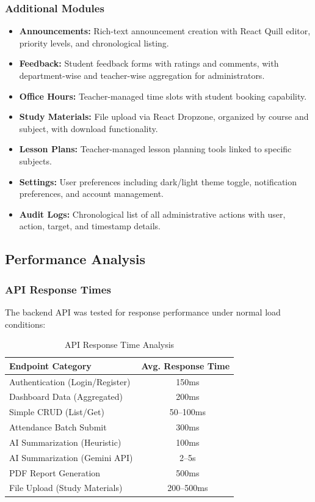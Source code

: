 \subsubsection{Additional Modules}

\begin{itemize}[leftmargin=2em]
    \item \textbf{Announcements:} Rich-text announcement creation with React Quill editor, priority levels, and chronological listing.
    \item \textbf{Feedback:} Student feedback forms with ratings and comments, with department-wise and teacher-wise aggregation for administrators.
    \item \textbf{Office Hours:} Teacher-managed time slots with student booking capability.
    \item \textbf{Study Materials:} File upload via React Dropzone, organized by course and subject, with download functionality.
    \item \textbf{Lesson Plans:} Teacher-managed lesson planning tools linked to specific subjects.
    \item \textbf{Settings:} User preferences including dark/light theme toggle, notification preferences, and account management.
    \item \textbf{Audit Logs:} Chronological list of all administrative actions with user, action, target, and timestamp details.
\end{itemize}

\subsection{Performance Analysis}

\subsubsection{API Response Times}

The backend API was tested for response performance under normal load conditions:

\begin{table}[H]
\centering
\caption{API Response Time Analysis}
\label{tab:performance}
\begin{tabular}{|l|c|}
\hline
\textbf{Endpoint Category} & \textbf{Avg. Response Time} \\
\hline
Authentication (Login/Register) & ~150ms \\
\hline
Dashboard Data (Aggregated) & ~200ms \\
\hline
Simple CRUD (List/Get) & ~50--100ms \\
\hline
Attendance Batch Submit & ~300ms \\
\hline
AI Summarization (Heuristic) & ~100ms \\
\hline
AI Summarization (Gemini API) & ~2--5s \\
\hline
PDF Report Generation & ~500ms \\
\hline
File Upload (Study Materials) & ~200--500ms \\
\hline
\end{tabular}
\end{table}

